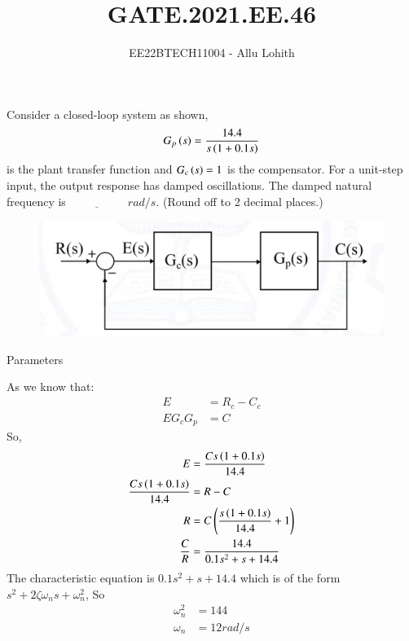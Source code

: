 \documentclass[journal,12pt,twocolumn]{IEEEtran}
\theoremstyle{remark}
\begin{document}

\vspace{3cm}

\title{GATE.2021.EE.46}
\author{EE22BTECH11004 - Allu Lohith}

\maketitle
\newpage
\bigskip

\renewcommand{\thefigure}{\theenumi}
\renewcommand{\thetable}{\theenumi}

Consider a closed-loop system as shown, $$G_p\left(s\right)= \frac{14.4}{s\left(1+0.1s\right)}$$ is the plant transfer function and $G_c\left(s\right)=1$ is the compensator. For a unit-step input, the output response has damped oscillations. The damped natural frequency is $\underline{\hspace{2cm}}$
$rad/s$. (Round off to 2 decimal places.)

\begin{figure}[h]
    \centering  
\includegraphics[width=\columnwidth]{figs/dia.png}
    \label{fig:}
\end{figure}
\solution 
\begin{table}[h!]
\centering

\vspace{0.5cm}
\caption{\normalsize Parameters}
\end{table}
As we know that:
\begin{align}
E&=R_c-C_c\\
EG_cG_p&=C
\end{align}
So,
\begin{align}
E &= \frac{Cs\left(1+0.1s\right)}{14.4}\\
\frac{Cs\left(1+0.1s\right)}{14.4} &=R-C\\
R &=C\left(\frac{s\left(1+0.1s\right)}{14.4}+1\right)\\
\frac{C}{R} &= \frac{14.4}{0.1s^2+s+14.4}
\end{align}
The characteristic equation is $0.1s^2+s+14.4$ which is of the form $s^2 + 2\zeta\omega_n s + \omega_n^2$, So 
\begin{align}
    \omega_n^2&=144\\
    \omega_n&= 12rad/s
\end{align}
\end{document}
